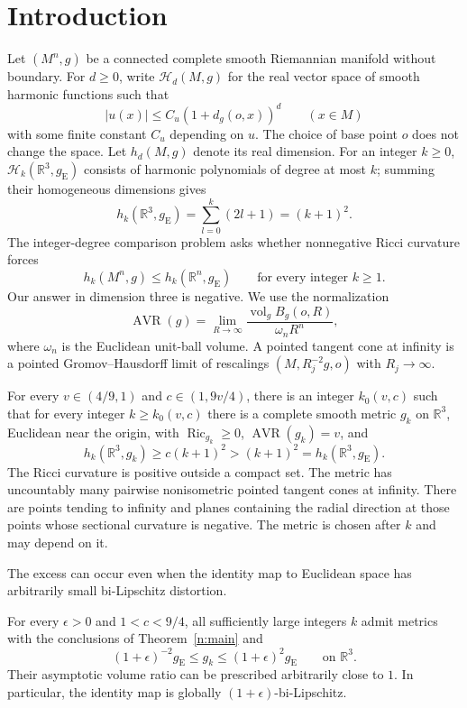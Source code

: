 \section{Introduction}\label{n:introduction}

Let $(M^n,g)$ be a connected complete smooth Riemannian manifold without
boundary. For $d\geq0$, write $\mathcal H_d(M,g)$ for the real vector space
of smooth harmonic functions such that
\[
 |u(x)|\leq C_u(1+d_g(o,x))^d\qquad(x\in M)
\]
with some finite constant $C_u$ depending on $u$. The choice of base point
$o$ does not change the space. Let $h_d(M,g)$ denote its real dimension.
For an integer $k\geq0$, $\mathcal H_k(\mathbb R^3,g_{\mathrm E})$ consists of harmonic
polynomials of degree at most $k$; summing their homogeneous dimensions gives
\begin{equation}\label{n:euclidean-count}
 h_k(\mathbb R^3,g_{\mathrm E})=\sum_{l=0}^k(2l+1)=(k+1)^2.
\end{equation}
The integer-degree comparison problem asks whether nonnegative Ricci
curvature forces
\[
 h_k(M^n,g)\leq h_k(\mathbb R^n,g_{\mathrm E})
 \qquad\text{for every integer }k\geq1.
\]
Our answer in dimension three is negative.
We use the normalization
\[
 \operatorname{AVR}(g)=\lim_{R\to\infty}\frac{\operatorname{vol}_g B_g(o,R)}{\omega_nR^n},
\]
where $\omega_n$ is the Euclidean unit-ball volume. A pointed tangent cone
at infinity is a pointed Gromov--Hausdorff limit of rescalings
$(M,R_j^{-2}g,o)$ with $R_j\to\infty$.

\begin{theorem}\label{n:main}
For every \(v\in(4/9,1)\) and \(c\in(1,9v/4)\), there is an integer
\(k_0(v,c)\) such that for every integer \(k\geq k_0(v,c)\) there is a
complete smooth metric \(g_k\) on \(\mathbb R^3\), Euclidean near the
origin, with \(\operatorname{Ric}_{g_k}\geq0\),
\(\operatorname{AVR}(g_k)=v\), and
\[
 h_k(\mathbb R^3,g_k)\geq c(k+1)^2>(k+1)^2
 =h_k(\mathbb R^3,g_{\mathrm E}).
\]
The Ricci curvature is positive outside a compact set. The metric has
uncountably many pairwise nonisometric pointed tangent cones at infinity.
There are points tending to infinity and planes containing the radial
direction at those points whose sectional curvature is negative.
The metric is chosen after \(k\) and may depend on it.
\end{theorem}

The excess can occur even when the identity map to Euclidean space has
arbitrarily small bi-Lipschitz distortion.

\begin{corollary}\label{n:near-euclidean}
For every \(\epsilon>0\) and \(1<c<9/4\), all sufficiently large integers
\(k\) admit metrics with the conclusions of Theorem~\ref{n:main} and
\[
 (1+\epsilon)^{-2}g_{\mathrm E}\leq g_k
       \leq(1+\epsilon)^2g_{\mathrm E}
 \qquad\text{on }\mathbb R^3.
\]
Their asymptotic volume ratio can be prescribed arbitrarily close to \(1\).
In particular, the identity map is globally \((1+\epsilon)\)-bi-Lipschitz.
\end{corollary}

